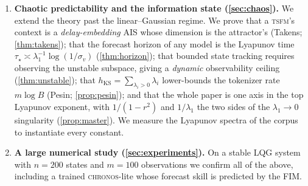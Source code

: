 \documentclass[10pt]{article}
\theoremstyle{plain}
\theoremstyle{definition}
\theoremstyle{remark}
\newcommand{\TSFM}{\textsc{tsfm}}
\newcommand{\Chronos}{\textsc{chronos}}
\newcommand{\hKS}{h_{\mathrm{KS}}}
\begin{document}
\begin{enumerate}[leftmargin=1.6em,itemsep=2pt]
generative corpus---a stable modal LQG process and four nonlinear
oscillator/field systems (multi-population Kuramoto, cluster Stuart--Landau,
Kuramoto--Sivashinsky, Lorenz--96)---giving each system's exact transition
structure and every hyperparameter, alongside the \Chronos-lite architecture and
training recipe, so the theory below is anchored to reproducible objects
(\cref{tab:zoo,tab:hyper,tab:tsfmarch}).
\item \textbf{Chaotic predictability and the information state
(\cref{sec:chaos}).} We extend the theory past the linear--Gaussian regime. We
prove that a \TSFM's context is a \emph{delay-embedding} AIS whose dimension is
the attractor's (Takens; \cref{thm:takens}); that the forecast horizon of any
model is the Lyapunov time $\tau_\star\asymp\lambda_1^{-1}\log(1/\sigma_v)$
(\cref{thm:horizon}); that bounded state tracking requires observing the unstable
subspace, giving a \emph{dynamic} observability ceiling (\cref{thm:unstable});
that $\hKS=\sum_{\lambda_i>0}\lambda_i$ lower-bounds the tokenizer rate $m\log B$
(Pesin; \cref{prop:pesin}); and that the whole paper is one axis in the top
Lyapunov exponent, with $1/(1-r^2)$ and $1/\lambda_1$ the two sides of the
$\lambda_1\!\to\!0$ singularity (\cref{prop:master}). We measure the Lyapunov
spectra of the corpus to instantiate every constant.
\item \textbf{A large numerical study (\cref{sec:experiments}).} On a stable LQG
system with $n=200$ states and $m=100$ observations we confirm all of the above,
including a trained \Chronos-lite whose forecast skill is predicted by the FIM.
\end{enumerate}
\end{document}
